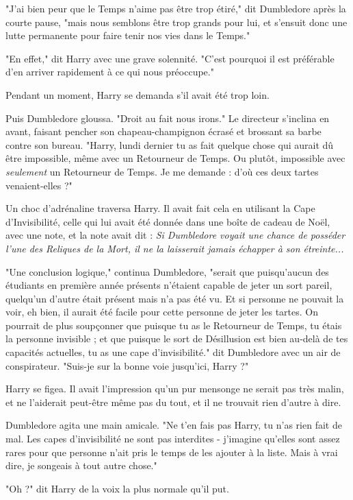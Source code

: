 "J'ai bien peur que le Temps n'aime pas être trop étiré," dit Dumbledore après la courte pause, "mais nous semblons être trop grands pour lui, et s'ensuit donc une lutte permanente pour faire tenir nos vies dans le Temps."

"En effet," dit Harry avec une grave solennité. "C'est pourquoi il est préférable d'en arriver rapidement à ce qui nous préoccupe."

Pendant un moment, Harry se demanda s'il avait été trop loin.

Puis Dumbledore gloussa. "Droit au fait nous irons." Le directeur s'inclina en avant, faisant pencher son chapeau-champignon écrasé et brossant sa barbe contre son bureau. "Harry, lundi dernier tu as fait quelque chose qui aurait dû être impossible, même avec un Retourneur de Temps. Ou plutôt, impossible avec \emph{seulement } un Retourneur de Temps. Je me demande : d'où ces deux tartes venaient-elles ?"

Un choc d'adrénaline traversa Harry. Il avait fait cela en utilisant la Cape d'Invisibilité, celle qui lui avait été donnée dans une boîte de cadeau de Noël, avec une note, et la note avait dit : \emph{Si Dumbledore voyait une chance de posséder l'une des Reliques de la Mort, il ne la laisserait jamais échapper à son étreinte...} 

"Une conclusion logique," continua Dumbledore, "serait que puisqu'aucun des étudiants en première année présents n'étaient capable de jeter un sort pareil, quelqu'un d'autre était présent mais n'a pas été vu. Et si personne ne pouvait la voir, eh bien, il aurait été facile pour cette personne de jeter les tartes. On pourrait de plus soupçonner que puisque tu as le Retourneur de Temps, tu étais la personne invisible ; et que puisque le sort de Désillusion est bien au-delà de tes capacités actuelles, tu as une cape d'invisibilité." dit Dumbledore avec un air de conspirateur. "Suis-je sur la bonne voie jusqu'ici, Harry ?"

Harry se figea. Il avait l'impression qu'un pur mensonge ne serait pas très malin, et ne l'aiderait peut-être même pas du tout, et il ne trouvait rien d'autre à dire.

Dumbledore agita une main amicale. "Ne t'en fais pas Harry, tu n'as rien fait de mal. Les capes d'invisibilité ne sont pas interdites - j'imagine qu'elles sont assez rares pour que personne n'ait pris le temps de les ajouter à la liste. Mais à vrai dire, je songeais à tout autre chose."

"Oh ?" dit Harry de la voix la plus normale qu'il put.

